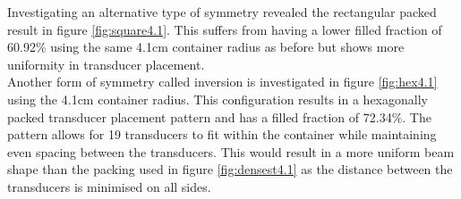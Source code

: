 Investigating an alternative type of symmetry revealed the rectangular packed result in figure \ref{fig:square4.1}. This suffers from having a lower filled fraction of 60.92\% using the same 4.1cm container radius as before but shows more uniformity in transducer placement.\\

Another form of symmetry called inversion is investigated in figure \ref{fig:hex4.1} using the 4.1cm container radius. This configuration results in a hexagonally packed transducer placement pattern and has a filled fraction of 72.34\%. The pattern allows for 19 transducers to fit within the container while maintaining even spacing between the transducers. This would result in a more uniform beam shape than the packing used in figure \ref{fig:densest4.1} as the distance between the transducers is minimised on all sides.


